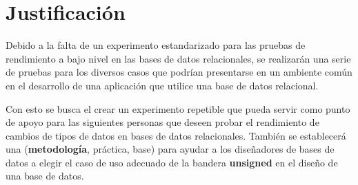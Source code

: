 \section{Justificación}


Debido a la falta de un experimento estandarizado para las pruebas de rendimiento a bajo nivel en las bases de datos relacionales, se realizarán una serie de pruebas para los diversos casos que podrían presentarse en un ambiente común en el desarrollo de una aplicación que utilice una base de datos relacional.

Con esto se busca el crear un experimento repetible que pueda servir como punto de apoyo para las siguientes personas que deseen probar el rendimiento de cambios de tipos de datos en bases de datos relacionales. También se establecerá una (\textbf{metodología}, práctica, base) para ayudar a los diseñadores de bases de datos a elegir el caso de uso adecuado de la bandera \textbf{unsigned} en el diseño de una base de datos.
